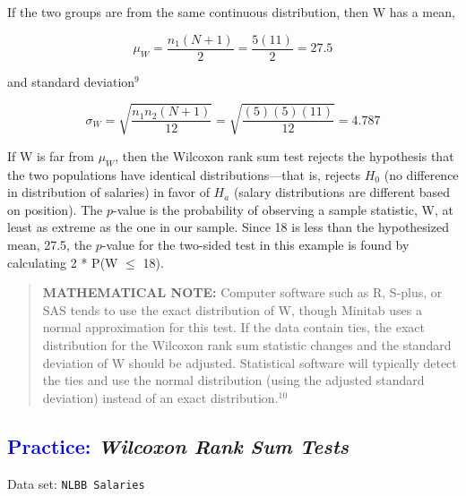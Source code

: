 \documentclass[
]{report}
\begin{document}
If the two groups are from the same continuous distribution, then W has a mean,

\begin{equation} 
  \mu_W = \frac{n_1(N+1)}{2} = \frac{5(11)}{2}=27.5
  \tag{1.3} \label{eq:1_3}
\end{equation}

and standard deviation\(^9\)

\begin{equation} 
  \sigma_W = \sqrt{\frac{n_1n_2(N+1)}{12}} = \sqrt{\frac{(5)(5)(11)}{12}}= 4.787
  \tag{1.4} \label{eq:1_4}
\end{equation}

If W is far from \(\scriptstyle \mu_W\), then the Wilcoxon rank sum test rejects the hypothesis that the two populations have identical distributions---that is, rejects \(\scriptstyle H_0\) (no difference in distribution of salaries) in favor of \(\scriptstyle H_a\) (salary distributions are different based on position). The \(\scriptstyle p\)-value is the probability of observing a sample statistic, W, at least as extreme as the one in our sample. Since 18 is less than the hypothesized mean, 27.5, the \(\scriptstyle p\)-value for the two-sided test in this example is found by calculating 2 * P(W \(\scriptstyle \leq\) 18).

\begin{quote}
\textbf{MATHEMATICAL NOTE:} Computer software such as R, S-plus, or SAS tends to use the exact distribution of W, though Minitab uses a normal approximation for this test. If the data contain ties, the exact distribution for the Wilcoxon rank sum statistic changes and the standard deviation of W should be adjusted. Statistical software will typically detect the ties and use the normal distribution (using the adjusted standard deviation) instead of an exact distribution.\(^{10}\)
\end{quote}

\hypertarget{wilcoxon-rank-sum-tests}{%
\subsection*{\texorpdfstring{\textcolor{blue}{Practice:} \emph{Wilcoxon Rank Sum Tests}}{ Wilcoxon Rank Sum Tests}}\label{wilcoxon-rank-sum-tests}}

\vspace{-1em}

Data set: \texttt{NLBB\ Salaries}
\end{document}
